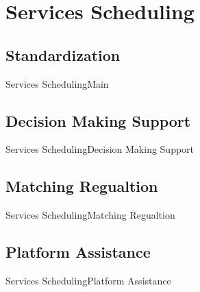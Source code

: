 \section{Services Scheduling}
\subsection{Standardization}
\begin{frame}{Services Scheduling}{Main}

\end{frame}
\subsection{Decision Making Support}
\begin{frame}{Services Scheduling}{Decision Making Support}

\end{frame}

\subsection{Matching Regualtion}
\begin{frame}{Services Scheduling}{Matching Regualtion}

\end{frame}

\subsection{Platform Assistance}
\begin{frame}{Services Scheduling}{Platform Assistance}

\end{frame}